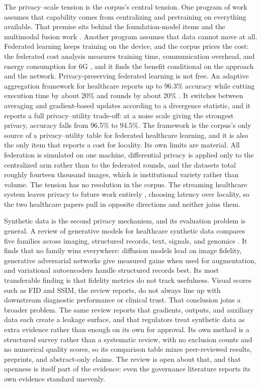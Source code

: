 \documentclass[pdflatex,sn-basic,Numbered]{sn-jnl}%
\begin{document}
The privacy--scale tension is the corpus's central tension. One program of work assumes that capability comes from centralizing and pretraining on everything available. That premise sits behind the foundation-model items \citep{wang2026mllm,chai2025graphllm} and the multimodal fusion work \citep{muneer2026classical}. Another program assumes that data cannot move at all. Federated learning keeps training on the device, and the corpus prices the cost: the federated cost analysis measures training time, communication overhead, and energy consumption for 6G \citep{teixeira2025efficient}, and it finds the benefit conditional on the approach and the network. Privacy-preserving federated learning is not free. An adaptive aggregation framework for healthcare reports up to 96.3\% accuracy while cutting execution time by about 20\% and rounds by about 20\% \citep{haripriya2025privacy}. It switches between averaging and gradient-based updates according to a divergence statistic, and it reports a full privacy--utility trade-off: at a noise scale giving the strongest privacy, accuracy falls from 96.5\% to 94.5\%. The framework is the corpus's only source of a privacy--utility table for federated healthcare learning, and it is also the only item that reports a cost for locality. Its own limits are material. All federation is simulated on one machine, differential privacy is applied only to the centralized arm rather than to the federated rounds, and the datasets total roughly fourteen thousand images, which is institutional variety rather than volume. The tension has no resolution in the corpus. The streaming healthcare system leaves privacy to future work entirely \citep{saleh2025cloud}, choosing latency over locality, so the two healthcare papers pull in opposite directions and neither joins them.

Synthetic data is the second privacy mechanism, and its evaluation problem is general. A review of generative models for healthcare synthetic data compares five families across imaging, structured records, text, signals, and genomics \citep{waseem2025synthetic}. It finds that no family wins everywhere: diffusion models lead on image fidelity, generative adversarial networks give measured gains when used for augmentation, and variational autoencoders handle structured records best. Its most transferable finding is that fidelity metrics do not track usefulness. Visual scores such as FID and SSIM, the review reports, do not always line up with downstream diagnostic performance or clinical trust. That conclusion joins a broader problem. The same review reports that gradients, outputs, and auxiliary data each create a leakage surface, and that regulators treat synthetic data as extra evidence rather than enough on its own for approval. Its own method is a structured survey rather than a systematic review, with no exclusion counts and no numerical quality scores, so its comparison table mixes peer-reviewed results, preprints, and abstract-only claims. The review is open about that, and that openness is itself part of the evidence: even the governance literature reports its own evidence standard unevenly.
\end{document}
